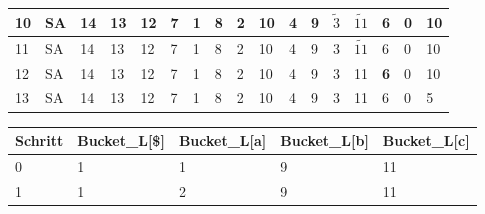 \begin{table}
{\begin{tabular}{l|l|lllllllllllllll}
			10      & SA & 14          & 13                                  & 12                                  & 7          & 1          & 8                         & 2                         & 10          & 4          & \cellcolor[HTML]{3166FF}9               & \textbf{$\widetilde{3}$}                & $\widetilde{11}$                         & 6                         & 0                         & 10                        \\ \hline
			11      & SA & 14          & 13                                  & 12                                  & 7          & 1          & 8                         & 2                         & 10          & 4          & 9                                       & \cellcolor[HTML]{3166FF}3               & \textbf{$\widetilde{11}$}                & 6                         & 0                         & 10                        \\ \hline
			12      & SA & 14          & 13                                  & 12                                  & 7          & 1          & 8                         & 2                         & 10          & 4          & 9                                       & 3                                       & \cellcolor[HTML]{3166FF}11               & \textbf{6}                & 0                         & 10                        \\ \hline
			13      & SA & 14          & 13                                  & 12                                  & 7          & 1          & 8                         & 2                         & 10          & 4          & 9                                       & 3                                       & 11                                       & 6                         & 0                         & \cellcolor[HTML]{32CB00}5 \\ \hline
		\end{tabular}%
	}
	\centering
	\begin{tabular}{l|l|l|l|l}
		Schritt & Bucket\_L{[}\${]} & Bucket\_L{[}a{]}          & Bucket\_L{[}b{]}           & Bucket\_L{[}c{]}           \\ \hline
		0       & 1                 & 1                         & 9                          & 11                         \\ \hline
		1       & 1                 & \cellcolor[HTML]{32CB00}2 & 9                          & 11                         \\ \hline

\end{tabular}
\end{table}
